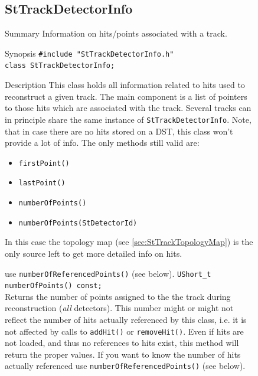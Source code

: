 \documentclass[twoside]{article}
\begin{document}
\begin{figure}[htb]
\begin{center}
\subsection{StTrackDetectorInfo}
\item[Summary] Information on hits/points associated with a track.
\item[Synopsis]
    \verb+#include "StTrackDetectorInfo.h"+\\
    \verb+class StTrackDetectorInfo;+\\
\item[Description] This class holds all information related to hits
    used to reconstruct a given track. The main component is a list of
    pointers to those hits which are associated with the track.
    Several tracks can in principle share the same instance of
    \texttt{StTrackDetectorInfo}.  Note, that in case there are no
    hits stored on a DST, this class won't provide a lot of info.
    The only methods still valid are:
    \begin{itemize}
    \item \texttt{firstPoint()}
    \item \texttt{lastPoint()}
    \item \texttt{numberOfPoints()}
    \item \texttt{numberOfPoints(StDetectorId)}
    \end{itemize}
    In this case the topology map (see \ref{sec:StTrackTopologyMap})
    is the only source left to get more detailed info on hits.
    
    
    use \texttt{numberOfReferencedPoints()} (see below).
    \verb+UShort_t numberOfPoints() const;+\\
    Returns the number of points assigned to the the track during
    reconstruction (\emph{all} detectors).  This number might or might
    not reflect the number of hits actually referenced by this class,
    i.e. it is not affected by calls to \texttt{addHit()} or
    \texttt{removeHit()}. Even if hits are not loaded, and thus no
    references to hits exist, this method will return the proper
    values. If you want to know the number of hits actually referenced
    use \texttt{numberOfReferencedPoints()} (see below).


\end{center}
\end{figure}
\end{document}
